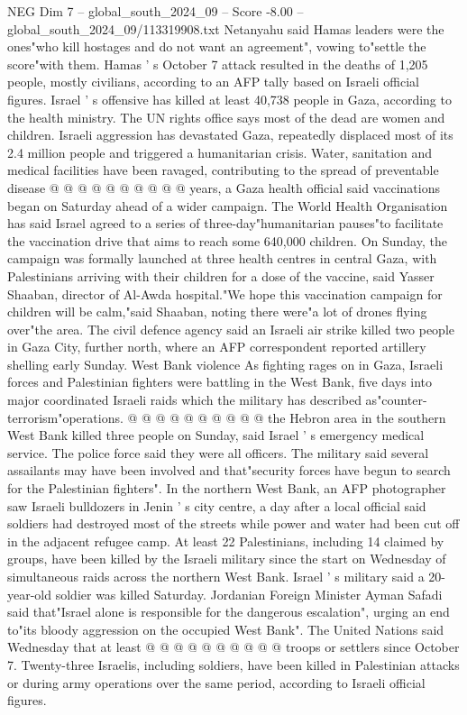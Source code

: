 \begin{textsample}{NEG Dim 7 – global\_south\_2024\_09 – Score -8.00 – global\_south\_2024\_09/113319908.txt}
Netanyahu said Hamas leaders were the ones"who kill hostages and do not want an agreement", vowing to"settle the score"with them.
Hamas ' s October 7 attack resulted in the deaths of 1,205 people, mostly civilians, according to an AFP tally based on Israeli official figures.
Israel ' s offensive has killed at least 40,738 people in Gaza, according to the health ministry.
The UN rights office says most of the dead are women and children.
Israeli aggression has devastated Gaza, repeatedly displaced most of its 2.4 million people and triggered a humanitarian crisis.
Water, sanitation and medical facilities have been ravaged, contributing to the spread of preventable disease @ @ @ @ @ @ @ @ @ @ years, a Gaza health official said vaccinations began on Saturday ahead of a wider campaign.
The World Health Organisation has said Israel agreed to a series of three-day"humanitarian pauses"to facilitate the vaccination drive that aims to reach some 640,000 children.
On Sunday, the campaign was formally launched at three health centres in central Gaza, with Palestinians arriving with their children for a dose of the vaccine, said Yasser Shaaban, director of Al-Awda hospital."We hope this vaccination campaign for children will be calm,"said Shaaban, noting there were"a lot of drones flying over"the area.
The civil defence agency said an Israeli air strike killed two people in Gaza City, further north, where an AFP correspondent reported artillery shelling early Sunday.
West Bank violence As fighting rages on in Gaza, Israeli forces and Palestinian fighters were battling in the West Bank, five days into major coordinated Israeli raids which the military has described as"counter-terrorism"operations. @ @ @ @ @ @ @ @ @ @ the Hebron area in the southern West Bank killed three people on Sunday, said Israel ' s emergency medical service.
The police force said they were all officers.
The military said several assailants may have been involved and that"security forces have begun to search for the Palestinian fighters".
In the northern West Bank, an AFP photographer saw Israeli bulldozers in Jenin ' s city centre, a day after a local official said soldiers had destroyed most of the streets while power and water had been cut off in the adjacent refugee camp.
At least 22 Palestinians, including 14 claimed by groups, have been killed by the Israeli military since the start on Wednesday of simultaneous raids across the northern West Bank.
Israel ' s military said a 20-year-old soldier was killed Saturday.
Jordanian Foreign Minister Ayman Safadi said that"Israel alone is responsible for the dangerous escalation", urging an end to"its bloody aggression on the occupied West Bank".
The United Nations said Wednesday that at least @ @ @ @ @ @ @ @ @ @ troops or settlers since October 7.
Twenty-three Israelis, including soldiers, have been killed in Palestinian attacks or during army operations over the same period, according to Israeli official figures.

\end{textsample}
